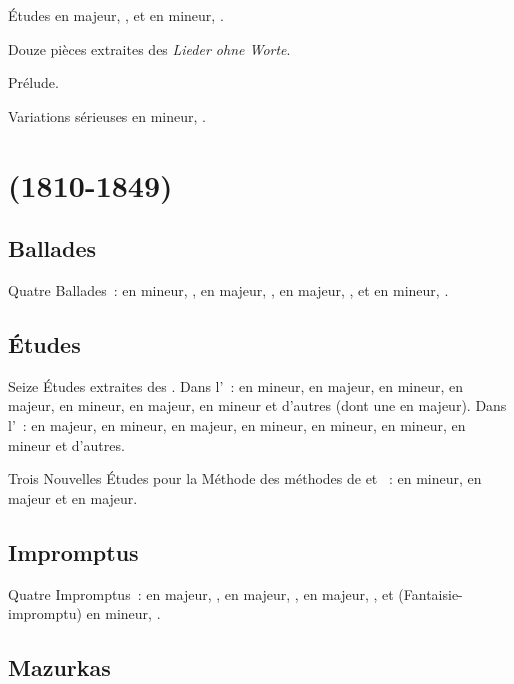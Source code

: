 Études en \kF majeur,  , et en \kA mineur, 
.

Douze pièces extraites des \emph{Lieder ohne Worte}.

Prélude.

Variations sérieuses en \kD mineur, .

\section[%
Fryderyk Chopin (1810-1849)]{%
\FChopin{} (1810-1849)}

\subsection{Ballades}

Quatre Ballades~:  en \kG mineur, ,  en \kF
majeur, ,  en \kA \Flat majeur, , et 
en \kF mineur, .

\subsection{Études}

Seize Études extraites des .
Dans l'~:  en \kA mineur,  en \kE majeur,
 en \kC \Sharp mineur,  en \kG \Flat majeur, 
en \kE \Flat mineur,  en \kF majeur,  en \kF mineur et
d'autres (dont une en \kC majeur).
Dans l'~:  en \kA \Flat majeur,  en \kF mineur,
 en \kF majeur,  en \kA mineur,  en \kE
mineur,  en \kC \Sharp mineur,  en \kC mineur et
d'autres.

Trois Nouvelles Études pour la Méthode des méthodes de \Moscheles{} et
\Fetis{}~:  en \kF mineur,  en \kA \Flat majeur et
 en \kD \Flat majeur.

\subsection{Impromptus}

Quatre Impromptus~:  en \kA \Flat majeur, ,  en
\kF \Sharp majeur, ,  en \kG \Flat majeur, , et
 (Fantaisie-impromptu) en \kC \Sharp mineur, .

\subsection{Mazurkas}

